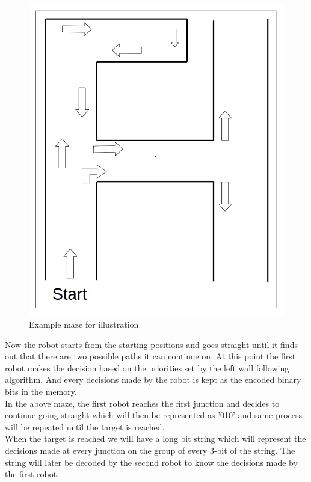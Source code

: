 \begin{figure}[h]
\center
\includegraphics[scale=0.5]{mazebold.jpg}   
\caption{Example maze for illustration}
\end{figure}
\justify Now the robot starts from the starting positions and goes straight until it finds out that there are two possible paths it can continue on. At this point the first robot makes the decision based on the priorities set by the left wall following algorithm. And every decisions made by the robot is kept as the encoded binary bits in the memory.\\
In the above maze, the first robot reaches the first junction and decides to continue going straight which will then be represented as '010' and same process will be repeated until the target is reached.\\
 When the target is reached we will have a long bit string which will represent the decisions made at every junction on the group of every 3-bit of the string. The string will later be decoded by the second robot to know the decisions made by the first robot.
